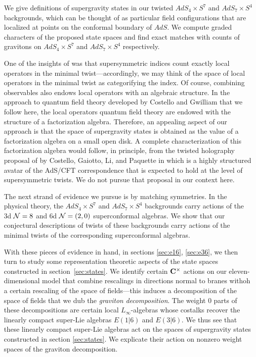 \documentclass{amsart}
\begin{document}
We give definitions of supergravity states in our twisted $AdS_4\times S^7$ and $AdS_7\times S^4$ backgrounds, which can be thought of as particular field configurations that are localized at points on the conformal boundary of $AdS$. 
We compute graded characters of the proposed state spaces and find exact matches with counts of gravitons on $AdS_4\times S^7$ and $AdS_7\times S^4$ respectively.

One of the insights of \cite{SWchar} was that supersymmetric indices count exactly local operators in the minimal twist---accordingly, we may think of the space of local operators in the minimal twist as categorifying the index.
Of course, combining observables also endows local operators with an algebraic structure.
In the approach to quantum field theory developed by Costello and Gwilliam \cite{fact2} that we follow here, the local operators quantum field theory are endowed with the structure of a factorization algebra.
Therefore, an appealing aspect of our approach is that the space of supergravity states is obtained as the value of a factorization algebra on a small open disk.
A complete characterization of this factorization algebra would follow, in principle, from the twisted holography proposal of by Costello, Gaiotto, Li, and Paquette in \cite{CLsugra,CGhol,CPkoszul} which is a highly structured avatar of the AdS/CFT correspondence that is expected to hold at the level of supersymmetric twists.
We do not pursue that proposal in our context here.

The next strand of evidence we pursue is by matching symmetries. In the physical theory, the $AdS_4\times S^7$ and $AdS_7\times S^4$ backgrounds carry actions of the 3d $\mathcal{N}=8$ and 6d $\mathcal{N}=(2,0)$ superconformal algebras. We show that our conjectural descriptions of twists of these backgrounds carry actions of the minimal twists of the corresponding superconformal algebras. 

With these pieces of evidence in hand, in sections \ref{sec:e16}, \ref{sec:e36},  we then turn to study some representation theoretic aspects of the state spaces constructed in section~\ref{sec:states}. We identify certain $\mathbf{C}^\times$ actions on our eleven-dimensional model that combine rescalings in directions normal to branes withoh a certain rescaling of the space of fields---this induces a decomposition of the space of fields that we dub the \textit{graviton decomposition}. The weight $0$ parts of these decompositions are certain local $L_\infty$-algebras whose costalks recover the linearly compact super-Lie algebras $E(1|6)$ and $E(3|6)$. We thus see that these linearly compact super-Lie algebras act on the spaces of supergravity states constructed in section \ref{sec:states}. We explicate their action on nonzero weight spaces of the graviton decomposition.
\end{document}
